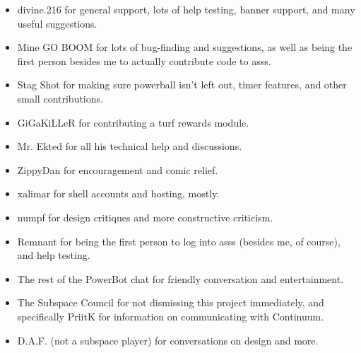 \documentclass{article}
\newcommand{\asss}{asss}
\begin{document}
\begin{itemize}

\item{divine.216} for general support, lots of help testing, banner
support, and many useful suggestions.

\item{Mine GO BOOM} for lots of bug-finding and suggestions, as well as
being the first person besides me to actually contribute code to
\asss{}.

\item{Stag Shot} for making sure powerball isn't left out, timer
features, and other small contributions.

\item{GiGaKiLLeR} for contributing a turf rewards module.

\item{Mr. Ekted} for all his technical help and discussions.

\item{ZippyDan} for encouragement and comic relief.

\item{xalimar} for shell accounts and hosting, mostly.

\item{numpf} for design critiques and more constructive criticism.

\item{Remnant} for being the first person to log into \asss{} (besides
me, of course), and help testing.

\item{The rest of the PowerBot chat} for friendly conversation and
entertainment.

\item{The Subspace Council} for not dismissing this project immediately,
and specifically PriitK for information on communicating with Continuum.


\item{D.A.F. (not a subspace player)} for conversations on design and
more.

\end{itemize}
\end{document}
